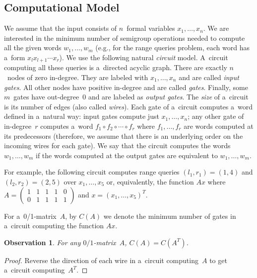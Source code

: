 \documentclass[11pt,letterpaper]{article}
\newtheorem{observation}{Observation}
\begin{document}
\subsection{Computational Model}
We assume that the input consists of $n$~formal variables $x_1, \dotsc, x_n$. We are interested in the minimum number of semigroup operations needed to compute all the given words $w_1, \dotsc, w_m$ (e.g., for the range queries problem, each word has a~form $x_lx_{l+1}\dotsb x_r$). We use the following natural {\em circuit} model. A~circuit computing all these queries is a~directed acyclic graph. There are exactly $n$~nodes of zero in-degree. They are labeled with $x_1, \dotsc, x_n$ and are called {\em input gates}. All other nodes have positive in-degree and are called {\em gates}. Finally, some $m$~gates have out-degree~0 and are labeled as {\em output gates}. The {\em size} of a~circuit is its number of edges (also called {\em wires}). Each gate of a~circuit computes a~word defined in a~natural way: input gates compute just $x_1, \dotsc, x_n$; any other gate of in-degree~$r$ computes a~word $f_1 \circ f_2 \circ \dotsb \circ f_r$ where $f_1, \dotsc, f_r$ are words computed at its predecessors (therefore, we assume that there is an underlying order on the incoming wires for each gate). We say that the circuit computes the words $w_1, \dotsc, w_m$ if the words computed at the output gates are equivalent to $w_1, \dotsc, w_m$.

For example, the following circuit computes range queries $(l_1,r_1)=(1,4)$ and $(l_2,r_2)=(2,5)$ over $x_1, \dotsc, x_5$ or, equivalently, the function $Ax$ where $A=\begin{pmatrix}1&1&1&1&0\\0&1&1&1&1\end{pmatrix}$ and $x=(x_1, \dotsc, x_5)^T$.

\begin{center}
\end{center}

For a~0/1-matrix~$A$, by $C(A)$ we denote the minimum 
number of gates in a~circuit computing the function $Ax$.
\begin{observation}\label{obs:transpose}
For any $0/1$-matrix~$A$, $C(A)=C(A^T)$.
\end{observation}
\begin{proof}
Reverse the direction of each wire in a~circuit computing~$A$ to get a~circuit computing~$A^T$.
\end{proof}
\end{document}
